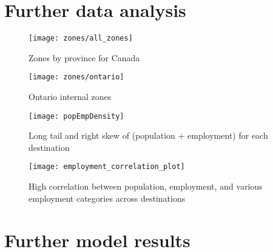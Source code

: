 \chapter{Further data analysis}
\clearpage
\begin{sidewaysfigure}
\centering
\texttt{[image: zones/all\_zones]}
\caption{Zones by province for Canada}
\label{fig:all-zones}
\end{sidewaysfigure}
\clearpage

\clearpage
\begin{sidewaysfigure}
\centering
\texttt{[image: zones/ontario]}
\caption{Ontario internal zones}
\label{fig:ontario-zones}
\end{sidewaysfigure}
\clearpage


\begin{figure}[H]
\centering
\texttt{[image: popEmpDensity]}
\caption{Long tail and right skew of (population + employment) for each destination}
\label{fig:pop-emp-density}
\end{figure}


\begin{figure}[H]
\centering
\texttt{[image: employment\_correlation\_plot]}
\caption{High correlation between population, employment, and various employment categories across destinations}
\label{fig:pop-emp-correlation}
\end{figure}

\chapter{Further model results}

